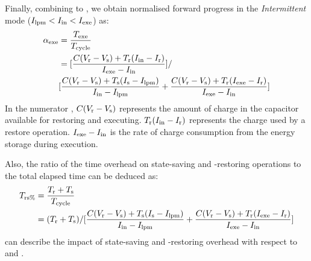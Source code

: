 Finally, combining  to , we obtain normalised forward progress  in the \textit{Intermittent} mode ($I_{\text{lpm}} < I_{\text{in}} < I_{\text{exe}}$) as:
\begin{equation}
    \begin{aligned}
        \alpha_{\text{exe}} &= \frac{T_{\text{exe}}}{T_{\text{cycle}}} \\
        &= [\frac{C (V_{\text{r}} - V_{\text{s}}) + T_{\text{r}} (I_{\text{in}} - I_{\text{r}})} {I_{\text{exe}} - I_{\text{in}}}] / \\
        &[\frac{C (V_{\text{r}} - V_{\text{s}}) + T_{\text{s}} (I_{\text{s}} - I_{\text{lpm}})}{I_{\text{in}} - I_{\text{lpm}}} + \frac{C (V_{\text{r}} - V_{\text{s}}) + T_{\text{r}} (I_{\text{exe}} - I_{\text{r}})}{I_{\text{exe}} - I_{\text{in}}}] \\
    \end{aligned}
    \label{eq:texepercent}
\end{equation}
In the numerator , $C(V_{\text{r}} - V_{\text{s}})$ represents the amount of charge in the capacitor available for restoring and executing. $T_{\text{r}} (I_{\text{in}} - I_{\text{r}})$ represents the charge used by a restore operation. $I_{\text{exe}} - I_{\text{in}}$ is the rate of charge consumption from the energy storage during execution.

Also, the ratio of the time overhead on state-saving and -restoring operations to the total elapsed time  can be deduced as:
\begin{equation}
    \begin{aligned}
        T_{\text{rs\%}} &= \frac{T_{\text{r}} + T_{\text{s}}}{T_{\text{cycle}}} \\
        &= (T_{\text{r}} + T_{\text{s}}) / [\frac{C (V_{\text{r}} - V_{\text{s}}) + T_{\text{s}} (I_{\text{s}} - I_{\text{lpm}})}{I_{\text{in}} - I_{\text{lpm}}} + \frac{C (V_{\text{r}} - V_{\text{s}}) + T_{\text{r}} (I_{\text{exe}} - I_{\text{r}})}{I_{\text{exe}} - I_{\text{in}}}]
    \end{aligned}
    \label{eq:trs}
\end{equation}
 can describe the impact of state-saving and -restoring overhead with respect to  and .


